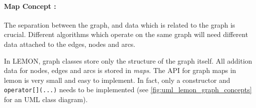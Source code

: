 \paragraph{Map Concept :}
    The separation between the graph, and data which is related to
    the graph is crucial.
    Different algorithms which operate on the same graph will
    need different data attached to the edges, nodes and arcs. 

    In LEMON, graph classes store only the structure of the graph itself.
    All addition data for nodes, edges and arcs is stored 
    in \emph{maps}.
    The API for graph maps in lemon is very small and easy to implement.
    In fact, only a constructor and \lstinline{operator[](...)} needs
    to be implemented (see \cref{fig:uml_lemon_graph_concepts} for an UML class diagram).



